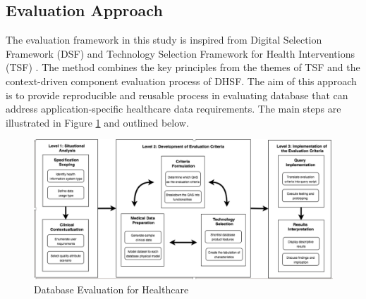 \documentclass[5p]{elsarticle}
\begin{document}
\subsection{Evaluation Approach}
The evaluation framework in this study is inspired from Digital Selection Framework (DSF) \cite{A.Ostrovsky20141} 
and Technology Selection Framework for Health Interventions (TSF) \cite{C.Chan2010300}. 
The method combines the key principles from the themes of TSF and the context-driven component evaluation process of DHSF.  
The aim of this approach is to provide reproducible and reusable process in evaluating database that can address application-specific healthcare data requirements.
The main steps are illustrated in Figure \ref{fig.framework} and outlined below. 

\begin{figure}[ht]
    \centering
    \includegraphics[scale=0.27] {figure}
    \caption{Database Evaluation for Healthcare}\label{fig.framework}
\end{figure}
\end{document}

